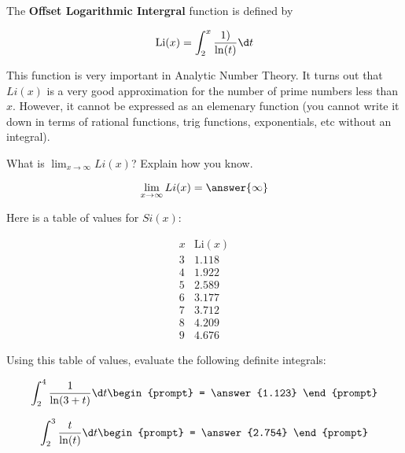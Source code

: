 \documentclass{ximera}
\author{Steven Gubkin}
\begin{document}
\begin{exercise}


The \textbf{Offset Logarithmic Intergral} function is defined by

\[
\mathrm{Li}(x) = \int_2^x \frac{1)}{\ln(t)} \d t
\]

This function is very important in Analytic Number Theory.  It turns out that $Li(x)$ is a very good approximation for the number of prime numbers less than $x$. However, it cannot be expressed as an elemenary function (you cannot write it down in terms of rational functions, trig functions, exponentials, etc without an integral).

\begin{exercise}
	What is $\lim_{x \to \infty} Li(x)$?  Explain how you know.
	
	\begin{prompt}
	\[
	\lim_{x \to \infty} Li(x) = \answer{\infty}
	\]
	\end{prompt}
\end{exercise}


Here is a table of values for $Si(x)$:

\[
\begin{array}{c|c}
 x & \mathrm{Li}(x)\\ \hline
3 &  1.118\\
4 & 1.922\\
5 & 2.589\\
6 & 3.177\\
7& 3.712\\
8 & 4.209\\
9 & 4.676
\end{array}
\]


Using this table of values, evaluate the following definite integrals:

\begin{exercise}
	\[
	\int_2^4 \frac{1}{\ln(3+t)} \d t \begin{prompt} = \answer{1.123} \end{prompt} 
	\]
\end{exercise}

\begin{exercise}
	\[
	\int_2^3 \frac{t}{\ln(t)} \d t \begin{prompt} = \answer{2.754} \end{prompt} 
	\]
\end{exercise}

\end{exercise}
\end{document}
